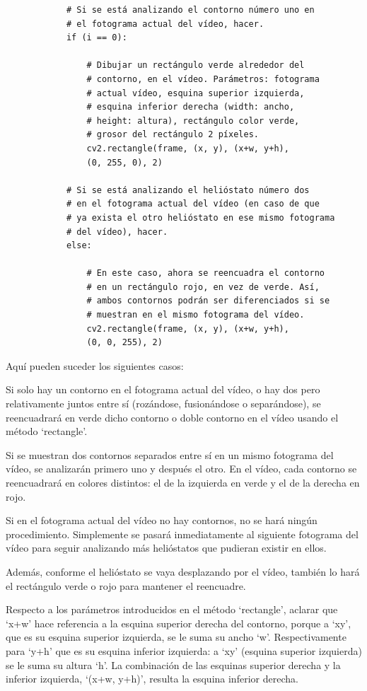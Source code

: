 \begin{lstlisting}
            # Si se está analizando el contorno número uno en
            # el fotograma actual del vídeo, hacer.
            if (i == 0):

                # Dibujar un rectángulo verde alrededor del
                # contorno, en el vídeo. Parámetros: fotograma
                # actual vídeo, esquina superior izquierda,
                # esquina inferior derecha (width: ancho,
                # height: altura), rectángulo color verde,
                # grosor del rectángulo 2 píxeles.
                cv2.rectangle(frame, (x, y), (x+w, y+h),
                (0, 255, 0), 2)

            # Si se está analizando el helióstato número dos
            # en el fotograma actual del vídeo (en caso de que
            # ya exista el otro helióstato en ese mismo fotograma
            # del vídeo), hacer.
            else:

                # En este caso, ahora se reencuadra el contorno
                # en un rectángulo rojo, en vez de verde. Así,
                # ambos contornos podrán ser diferenciados si se
                # muestran en el mismo fotograma del vídeo.
                cv2.rectangle(frame, (x, y), (x+w, y+h),
                (0, 0, 255), 2)
\end{lstlisting}

Aquí pueden suceder los siguientes casos:

Si solo hay un contorno en el fotograma actual del vídeo, o hay dos pero relativamente juntos entre sí (rozándose, fusionándose o separándose), se reencuadrará en verde dicho contorno o doble contorno en el vídeo usando el método ‘rectangle’.

Si se muestran dos contornos separados entre sí en un mismo fotograma del vídeo, se analizarán primero uno y después el otro. En el vídeo, cada contorno se reencuadrará en colores distintos: el de la izquierda en verde y el de la derecha en rojo.

Si en el fotograma actual del vídeo no hay contornos, no se hará ningún procedimiento. Simplemente se pasará inmediatamente al siguiente fotograma del vídeo para seguir analizando más helióstatos que pudieran existir en ellos.

Además, conforme el helióstato se vaya desplazando por el vídeo, también lo hará el rectángulo verde o rojo para mantener el reencuadre.

Respecto a los parámetros introducidos en el método ‘rectangle’, aclarar que ‘x+w’ hace referencia a la esquina superior derecha del contorno, porque a ‘xy’, que es su esquina superior izquierda, se le suma su ancho ‘w’. Respectivamente para ‘y+h’ que es su esquina inferior izquierda: a ‘xy’ (esquina superior izquierda) se le suma su altura ‘h’. La combinación de las esquinas superior derecha y la inferior izquierda, ‘(x+w, y+h)’, resulta la esquina inferior derecha.\\[20pt]

